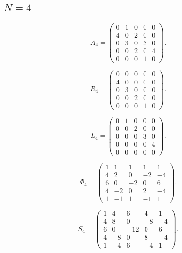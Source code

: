 \subsection{$N=4$}
\label{tab:matrices-N04}
\begingroup
\small
\setlength{\arraycolsep}{3pt}
\[
A_{4}=\begin{pmatrix}
0 & 1 & 0 & 0 & 0 \\
4 & 0 & 2 & 0 & 0 \\
0 & 3 & 0 & 3 & 0 \\
0 & 0 & 2 & 0 & 4 \\
0 & 0 & 0 & 1 & 0
\end{pmatrix}.
\]
\endgroup

\begingroup
\small
\setlength{\arraycolsep}{3pt}
\[
R_{4}=\begin{pmatrix}
0 & 0 & 0 & 0 & 0 \\
4 & 0 & 0 & 0 & 0 \\
0 & 3 & 0 & 0 & 0 \\
0 & 0 & 2 & 0 & 0 \\
0 & 0 & 0 & 1 & 0
\end{pmatrix}.
\]
\endgroup

\begingroup
\small
\setlength{\arraycolsep}{3pt}
\[
L_{4}=\begin{pmatrix}
0 & 1 & 0 & 0 & 0 \\
0 & 0 & 2 & 0 & 0 \\
0 & 0 & 0 & 3 & 0 \\
0 & 0 & 0 & 0 & 4 \\
0 & 0 & 0 & 0 & 0
\end{pmatrix}.
\]
\endgroup

\begingroup
\small
\setlength{\arraycolsep}{3pt}
\[
\Phi_{4}=\begin{pmatrix}
1 & 1 & 1 & 1 & 1 \\
4 & 2 & 0 & -2 & -4 \\
6 & 0 & -2 & 0 & 6 \\
4 & -2 & 0 & 2 & -4 \\
1 & -1 & 1 & -1 & 1
\end{pmatrix}.
\]
\endgroup

\begingroup
\small
\setlength{\arraycolsep}{3pt}
\[
S_{4}=\begin{pmatrix}
1 & 4 & 6 & 4 & 1 \\
4 & 8 & 0 & -8 & -4 \\
6 & 0 & -12 & 0 & 6 \\
4 & -8 & 0 & 8 & -4 \\
1 & -4 & 6 & -4 & 1
\end{pmatrix}.
\]
\endgroup


